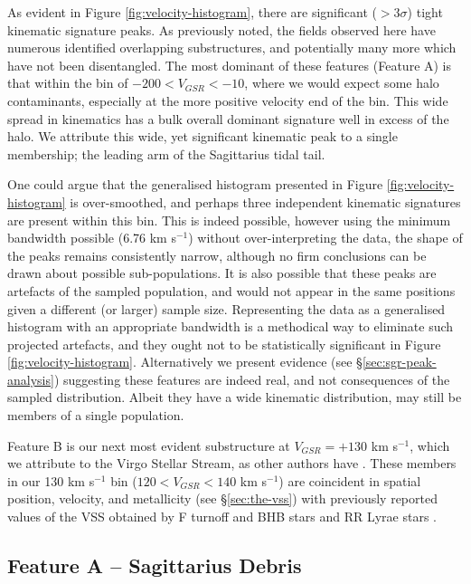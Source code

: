 \documentclass{emulateapj}
\begin{document}
				




	As evident in Figure \ref{fig:velocity-histogram}, there are significant ($> 3\sigma$) tight kinematic signature peaks. As previously noted, the fields observed here have numerous identified overlapping substructures, and potentially many more which have not been disentangled. The most dominant of these features (Feature A) is that within the bin of $-200 < V_{GSR} < -10$, where we would expect some halo contaminants, especially at the more positive velocity end of the bin. This wide spread in kinematics has a bulk overall dominant signature well in excess of the halo. We attribute this wide, yet significant kinematic peak to a single membership; the leading arm of the Sagittarius tidal tail. 	
		

	One could argue that the generalised histogram presented in Figure \ref{fig:velocity-histogram} is over-smoothed, and perhaps three independent kinematic signatures are present within this bin. This is indeed possible, however using the minimum bandwidth possible (6.76 km s$^{-1}$) without over-interpreting the data, the shape of the peaks remains consistently narrow, although no firm conclusions can be drawn about possible sub-populations. It is also possible that these peaks are artefacts of the sampled population, and would not appear in the same positions given a different (or larger) sample size. Representing the data as a generalised histogram with an appropriate bandwidth is a methodical way to eliminate such projected artefacts, and they ought not to be statistically significant in Figure \ref{fig:velocity-histogram}. Alternatively we present evidence (see \S\ref{sec:sgr-peak-analysis}) suggesting these features are indeed real, and not consequences of the sampled distribution. Albeit they have a wide kinematic distribution, may still be members of a single population.
		
	Feature B is our next most evident substructure at $V_{GSR} = +130$ km s$^{-1}$, which we attribute to the Virgo Stellar Stream, as other authors have \citep{Newberg;et-al_2007, Prior;et-al_2009a}. These members in our 130 km s$^{-1}$ bin ($120 < V_{GSR} < 140$ km s$^{-1}$) are coincident in spatial position, velocity, and metallicity (see \S\ref{sec:the-vss}) with previously reported values of the VSS obtained by F turnoff and BHB stars \citep{Newberg;et-al_2007} and RR Lyrae stars \citep{Prior;et-al_2009a}.
		
		
	\subsection{Feature A \--- Sagittarius Debris}
	
\end{document}
